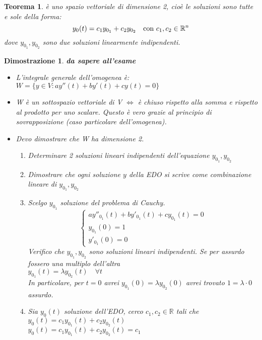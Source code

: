 \documentclass[10pt,landscape, a4paper]{article}
\newtheorem{teorema}{Teorema}
\newenvironment{thm}{\begin{mdframed}[backgroundcolor=white]\begin{teorema}}{\end{teorema}\end{mdframed}}
\newtheorem{demnstrn}{Dimostrazione}
\newenvironment{dimostrazione}{\begin{mdframed}[backgroundcolor=white]\begin{demnstrn}}{\end{demnstrn}\end{mdframed}}
\begin{document}
\begin{multicols}{3}
\begin{thm}
è uno spazio vettoriale di dimensione 2, cioè le soluzioni sono tutte e sole della forma:
\begin{equation}
y_0(t) = c_1y_{0_1}+c_2y_{0_2} \quad \textnormal{con } c_1,c_2 \in \mathbb{R}^n
\end{equation}
dove $y_{0_1},y_{0_2}$ sono due soluzioni linearmente indipendenti.
\end{thm}

\begin{dimostrazione}
\emph{\textbf{da sapere all'esame}}
\begin{itemize}
\item L'integrale generale dell'omogenea è:\\
		$W = \{y \in V : ay''(t) + by'(t) + cy(t) = 0\}$
\item W è un sottospazio vettoriale di V $\Leftrightarrow$ è chiuso rispetto alla somma e rispetto al prodotto per uno scalare. Questo è vero grazie al principio di sovrapposizione (caso particolare dell'omogenea).
\item Devo dimostrare che W ha dimensione 2.
\begin{enumerate}
	\item[$i ) $] Determinare 2 soluzioni lineari indipendenti dell'equazione $y_{0_1}, y_{0_2}$
	\item[$ii )$] Dimostrare che ogni soluzione $y$ della EDO si scrive come combinazione lineare di $y_{0_1}, y_{0_2}$
	\item [$i )$] Scelgo $y_{0_1}$ soluzione del problema di Cauchy.\\
				$$
				\left\{
				\begin{array}{ll}
					ay''_{0_1}(t) + by'_{0_1}(t) + cy_{0_1}(t) = 0\\
					y_{0_1}(0) = 1\\
					y'_{0_1}(0) = 0
				\end{array} \right.
				$$
				Verifico che $y_{0_1}, y_{0_2}$ sono soluzioni lineari indipendenti. Se per assurdo fossero una multiplo dell'altra\\
				$ y_{0_1}(t) = \lambda y_{0_2}(t) \quad \forall t$\\
				In particolare, per $t=0$ avrei $y_{0_1}(0) = \lambda y_{0_2}(0)$ avrei trovato $1=\lambda\cdot 0$ assurdo.
	\item [$ii )$] Sia $y_0(t)$ soluzione dell'EDO, cerco $c_1,c_2\in \mathbb{R}$ tali che $y_0(t) = c_1y_{0_1}(t) + c_2y_{0_2}(t)$\\
					$ y_0(t) = c_1y_{0_1}(t) + c_2y_{0_2}(t) = c_1$\\

\end{enumerate}
\end{itemize}
\end{dimostrazione}
\end{multicols}
\end{document}
